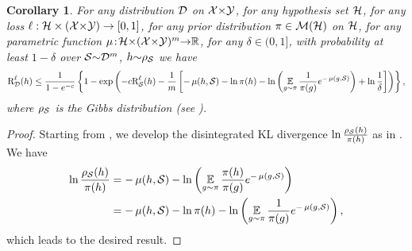 \documentclass[twoside]{article}
\theoremstyle{plain}
\newtheorem{corollary}[theorem]{Corollary}
\begin{document}
\begin{corollary}\label{corollary:disintegrated-catoni-original}
For any distribution $\mathcal{D}$ on $\mathcal{X}{\times}\mathcal{Y}$, for any hypothesis set $\mathcal{H}$, for any loss $\ell : \mathcal{H}\times(\mathcal{X}{\times}\mathcal{Y}) \to [0,1]$, for any prior distribution $\pi\in\mathcal{M}(\mathcal{H})$ on $\mathcal{H}$, for any parametric function $\operatorname{\mu}\!:\! \mathcal{H}{\times}(\mathcal{X}{\times}\mathcal{Y})^m{\to}\mathbb{R}$, for any $\delta\!\in\!(0,1]$, with probability at least $1{-}\delta$ over $\mathcal{S}{\sim}\mathcal{D}^m$, $h{\sim}\rho_{\mathcal{S}}$ we have
\begin{align*}
\text{R}^{\ell}_{\mathcal{D}}(h) \le \frac{1}{1-e^{-c}}\left\{1-\exp\left( -c\text{R}^{\ell}_{\mathcal{S}}(h) - \frac{1}{m}\left[ -\operatorname{\mu}(h, \mathcal{S}) -\ln\pi(h) - \ln\left(\operatorname*{\mathbb{E}}_{g\sim\pi} \frac{1}{\pi(g)}e^{-\operatorname{\mu}(g, \mathcal{S})}\right) + \ln\frac{1}{\delta}\right]\right)\right\},
\end{align*}
where $\rho_{\mathcal{S}}$ is the Gibbs distribution (see ).
\end{corollary}
\begin{proof}
Starting from , we develop the disintegrated KL divergence $\ln\frac{\rho_{\mathcal{S}}(h)}{\pi(h)}$ as in .
We have
\begin{align*} 
    \ln\frac{\rho_{\mathcal{S}}(h)}{\pi(h)} &= -\operatorname{\mu}(h, \mathcal{S}) - \ln\left(\operatorname*{\mathbb{E}}_{g\sim\pi} \frac{\pi(h)}{\pi(g)}e^{-\operatorname{\mu}(g, \mathcal{S})}\right)\\
    &= -\operatorname{\mu}(h, \mathcal{S}) -\ln\pi(h) - \ln\left(\operatorname*{\mathbb{E}}_{g\sim\pi} \frac{1}{\pi(g)}e^{-\operatorname{\mu}(g, \mathcal{S})}\right),
\end{align*}
which leads to the desired result.
\end{proof}
\end{document}
